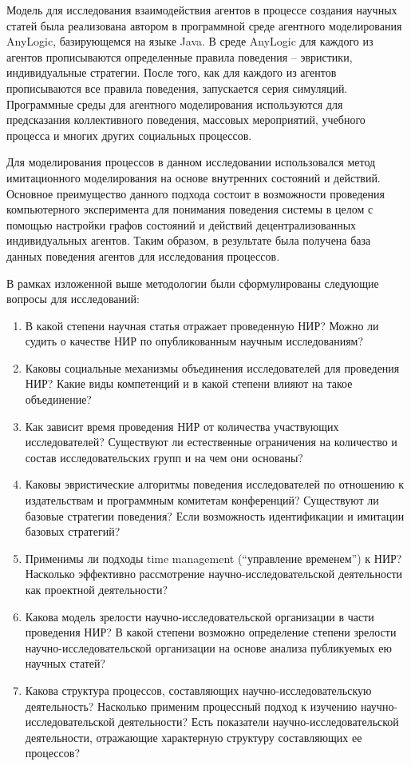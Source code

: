 Модель для исследования взаимодействия агентов в процессе создания научных статей была реализована автором в программной среде агентного моделирования AnyLogic, базирующемся на языке Java. 
В среде AnyLogic для каждого из агентов прописываются определенные правила поведения – эвристики, индивидуальные стратегии.
После того, как для каждого из агентов прописываются все правила поведения, запускается серия симуляций.
Программные среды для агентного моделирования используются для предсказания коллективного поведения, массовых мероприятий, учебного процесса и многих других социальных процессов.

Для моделирования процессов в данном исследовании использовался метод имитационного моделирования на основе внутренних состояний и действий.
Основное преимущество данного подхода состоит в возможности проведения компьютерного эксперимента для понимания поведения системы в целом с помощью настройки графов состояний и действий децентрализованных индивидуальных агентов. 
Таким образом, в результате была получена база данных поведения агентов для исследования процессов.

В рамках изложенной выше методологии были сформулированы следующие вопросы для исследований:
\begin{enumerate}
\item В какой степени научная статья отражает проведенную НИР? Можно ли судить о качестве НИР по опубликованным научным исследованиям?
\item Каковы социальные механизмы объединения исследователей для проведения НИР? Какие виды компетенций и в какой степени влияют на такое объединение?
\item Как зависит время проведения НИР от количества участвующих исследователей? Существуют ли естественные ограничения на количество и состав исследовательских групп и на чем они основаны?
\item Каковы эвристические алгоритмы поведения исследователей по отношению к издательствам и программным комитетам конференций? Существуют ли базовые стратегии поведения? Если возможность идентификации и имитации базовых стратегий?
\item Применимы ли подходы time management (``управление временем'') к НИР? Насколько эффективно рассмотрение научно-исследовательской деятельности как проектной деятельности?
\item Какова модель зрелости научно-исследовательской организации в части проведения НИР? В какой степени возможно определение степени зрелости научно-исследовательской организации на основе анализа публикуемых ею научных статей?
\item Какова структура процессов, составляющих научно-исследовательскую деятельность? Насколько применим процессный подход к изучению научно-исследовательской деятельности? Есть показатели научно-исследовательской деятельности, отражающие характерную структуру составляющих ее процессов?
\end{enumerate}


